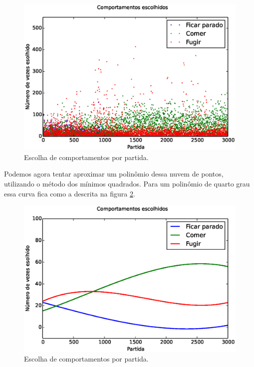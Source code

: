 \begin{figure}[H]
    \centering
    \includegraphics[width=\linewidth]{images/3_behaviors_small_map/chosen_behaviors}
    \caption{Escolha de comportamentos por partida.}
    \label{img:3ComportamentosMapaPequeno:ComportamentosEscolhidos}
\end{figure}

Podemos agora tentar aproximar um polinômio dessa nuvem de pontos, utilizando o método dos mínimos quadrados. Para um polinômio de quarto grau essa curva fica como a descrita na figura \ref{img:3ComportamentosMapaPequeno:ComportamentosEscolhidosPolinômio}.

\begin{figure}[H]
    \centering
    \includegraphics[width=\linewidth]{images/3_behaviors_small_map/chosen_behaviors_pol}
    \caption{Escolha de comportamentos por partida.}
    \label{img:3ComportamentosMapaPequeno:ComportamentosEscolhidosPolinômio}
\end{figure}

